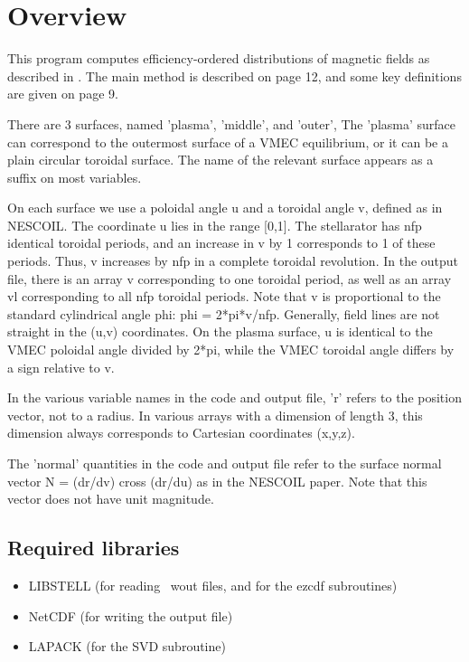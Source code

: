 \chapter{Overview}

This program computes efficiency-ordered distributions of magnetic fields as described in \cite{boozer2015}.  The main method is described on page 12, and some key definitions are given on page 9.

There are 3 surfaces, named 'plasma', 'middle', and 'outer', The 'plasma' surface can correspond to the outermost surface of a VMEC equilibrium, or it can be a plain circular toroidal surface. The name of the relevant surface appears as a suffix on
most variables.

On each surface we use a poloidal angle u and a toroidal angle v, defined as in NESCOIL.  The coordinate u lies in the range [0,1]. The stellarator has nfp identical toroidal periods, and an increase in v by 1 corresponds to 1 of these periods. Thus,
v increases by nfp in a complete toroidal revolution. In the output file, there is an array v corresponding to one toroidal period, as well as an array vl corresponding to all nfp toroidal periods.  Note that v is proportional to the standard
cylindrical angle phi: phi = 2*pi*v/nfp.  Generally, field lines are not straight in the (u,v) coordinates.  On the plasma surface, u is identical to the VMEC poloidal angle divided by 2*pi, while the VMEC toroidal angle differs by a sign relative to
v.

In the various variable names in the code and output file, 'r' refers to the position vector, not to a radius.  In various arrays with a dimension of length 3, this dimension always corresponds to Cartesian coordinates (x,y,z).

The 'normal' quantities in the code and output file refer to the surface normal vector N = (dr/dv) cross (dr/du) as in the NESCOIL paper. Note that this vector does not have unit magnitude.



\section{Required libraries}

\begin{itemize}

\item {\ttfamily LIBSTELL} (for reading \vmec~{\ttfamily wout} files, and for the {\ttfamily ezcdf} subroutines)
\item {\ttfamily NetCDF} (for writing the output file)
\item {\ttfamily LAPACK} (for the SVD subroutine)

\end{itemize}

